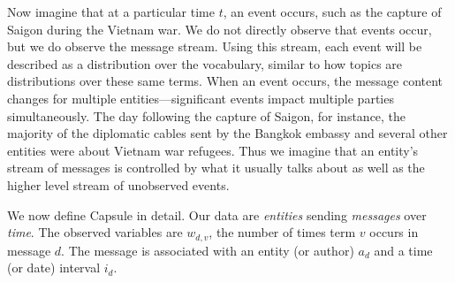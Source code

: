 Now imagine that at a particular time $t$, an event occurs, such as the capture of Saigon during the Vietnam war.  We do not directly observe that events occur, but we do observe the message stream.  Using this stream, each event will be described as a distribution over the vocabulary, similar to how topics are distributions over these same terms.  When an event occurs, the message content changes for multiple entities---significant events impact multiple parties simultaneously. The day following the capture of Saigon, for instance, the majority of the diplomatic cables sent by the Bangkok embassy and several other entities were about Vietnam war refugees.
Thus we imagine that an entity's stream of messages is controlled by what it usually talks about as well as the higher level stream of unobserved events.



We now define Capsule in detail. Our data are \textit{entities}
sending \textit{messages} over \textit{time}. The observed variables
are $w_{d,v}$, the number of times term $v$ occurs in message $d$. The
message is associated with an entity (or author) $a_d$ and a time (or
date) interval $i_d$.

